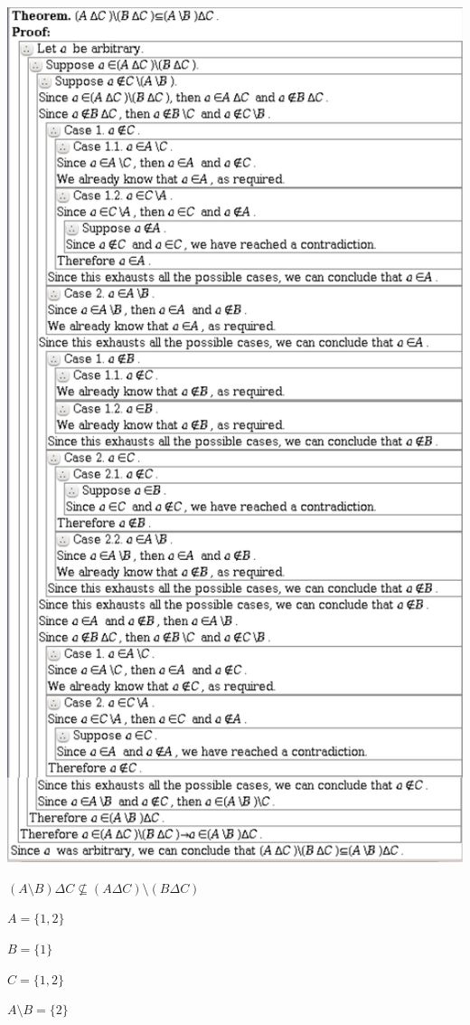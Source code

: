 \documentclass{article}
\begin{document}
\includegraphics[scale=0.15]{3_5_25}

$(A \setminus B) \Delta C \nsubseteq (A \Delta C) \setminus (B \Delta C)$

$A = \{1,2\}$

$B = \{1\}$

$C = \{1,2\}$

$A \setminus B = \{2\}$
\end{document}
